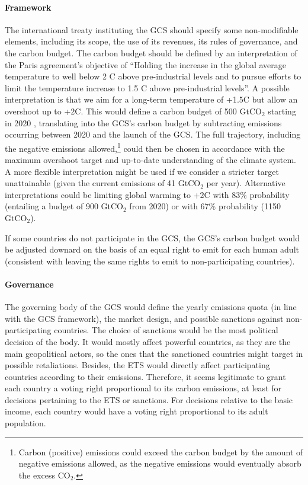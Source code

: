 \documentclass[12pt,english]{article}
\begin{document}
\paragraph{Framework} 
The international treaty instituting the GCS should specify some non-modifiable elements, including its scope, the use of its revenues, its rules of governance, and the carbon budget. The carbon budget should be defined by an interpretation of the Paris agreement's objective of 
``Holding the increase in the global average temperature to well below 2 \textdegree{}C above pre-industrial levels and to pursue efforts to limit the temperature increase to 1.5 \textdegree{}C above pre-industrial levels''. A possible interpretation is that we aim for a long-term temperature of +1.5\textdegree{}C but allow an overshoot up to +2\textdegree{}C. 
This would define a carbon budget of 500 GtCO$_\text{2}$ starting in 2020 \citep{ipcc_climate_2021}, translating into the GCS's carbon budget by subtracting emissions occurring between 2020 and the launch of the GCS. The full trajectory, including the negative emissions allowed,\footnote{Carbon (positive) emissions could exceed the carbon budget by the amount of negative emissions allowed, as the negative emissions would eventually absorb the excess CO$_\text{2}$.} could then be chosen in accordance with the maximum overshoot target and up-to-date understanding of the climate system. A more flexible interpretation might be used if we consider a stricter target unattainable (given the current emissions of 41 GtCO$_\text{2}$ per year). Alternative interpretations could be limiting global warming to +2\textdegree{}C with 83\% probability (entailing a budget of 900 GtCO$_\text{2}$ from 2020) or with 67\% probability (1150 GtCO$_\text{2}$). 

If some countries do not participate in the GCS, the GCS's carbon budget would be adjusted downard on the basis of an equal right to emit for each human adult (consistent with leaving the same rights to emit to non-participating countries).

\paragraph{Governance} 
The governing body of the GCS would define the yearly emissions quota (in line with the GCS framework), the market design, and possible sanctions against non-participating countries. The choice of sanctions would be the most political decision of the body. It would mostly affect powerful countries, as they are the main geopolitical actors, so the ones that the sanctioned countries might target in possible retaliations. Besides, the ETS would directly affect participating countries according to their emissions. Therefore, it seems legitimate to grant each country a voting right proportional to its carbon emissions, at least for decisions pertaining to the ETS or sanctions. For decisions relative to the basic income, each country would have a voting right proportional to its adult population. 
\end{document}
